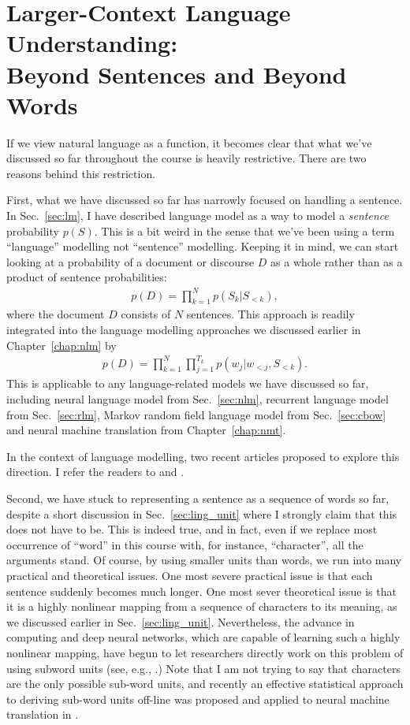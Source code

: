 \documentclass{report}
\begin{document}
\section{Larger-Context Language Understanding: \\
    Beyond Sentences and Beyond Words}

If we view natural language as a function, it becomes clear that what we've
discussed so far throughout the course is heavily restrictive. There are two
reasons behind this restriction. 

First, what we have discussed so far has narrowly focused on handling a
sentence. In Sec.~\ref{sec:lm}, I have described language model as a way to
model a {\em sentence} probability $p(S)$. This is a bit weird in the sense that
we've been using a term ``language'' modelling not ``sentence'' modelling.
Keeping it in mind, we can start looking at a probability of a document or
discourse $D$ as a whole rather than as a product of sentence probabilities:
\begin{align*}
    p(D) = \prod_{k=1}^N p(S_k | S_{<k}),
\end{align*}
where the document $D$ consists of $N$ sentences. This approach is readily
integrated into the language modelling approaches we discussed earlier in
Chapter~\ref{chap:nlm} by
\begin{align*}
    p(D) = \prod_{k=1}^N \prod_{j=1}^{T_k} p(w_j | w_{<j}, S_{<k}).
\end{align*}
This is applicable to any language-related models we have discussed so far,
including neural language model from Sec.~\ref{sec:nlm}, recurrent language
model from Sec.~\ref{sec:rlm}, Markov random
field language model from Sec.~\ref{sec:cbow} and neural machine translation
from Chapter~\ref{chap:nmt}.

In the context of language modelling, two recent articles proposed to explore
this direction. I refer the readers to \citet{wang2015larger} and
\citet{ji2015document}.

Second, we have stuck to representing a sentence as a sequence of words so far,
despite a short discussion in Sec.~\ref{sec:ling_unit} where I strongly claim
that this does not have to be. This is indeed true, and in fact, even if we
replace most occurrence of ``word'' in this course with, for instance,
``character'', all the arguments stand. Of course, by using smaller units than
words, we run into many practical and theoretical issues. One most severe
practical issue is that each sentence suddenly becomes much longer. One most
sever theoretical issue is that it is a highly nonlinear mapping from a sequence
of characters to its meaning, as we discussed earlier in
Sec.~\ref{sec:ling_unit}. Nevertheless, the advance in computing and deep neural
networks, which are capable of learning such a highly nonlinear mapping, have
begun to let researchers directly work on this problem of using subword units
(see, e.g., \citet{kim2015character,ling2015character}.) Note that I am not
trying to say that characters are the only possible sub-word units, and recently
an effective statistical approach to deriving sub-word units off-line was
proposed and applied to neural machine translation in \citet{sennrich2015neural}.
\end{document}
